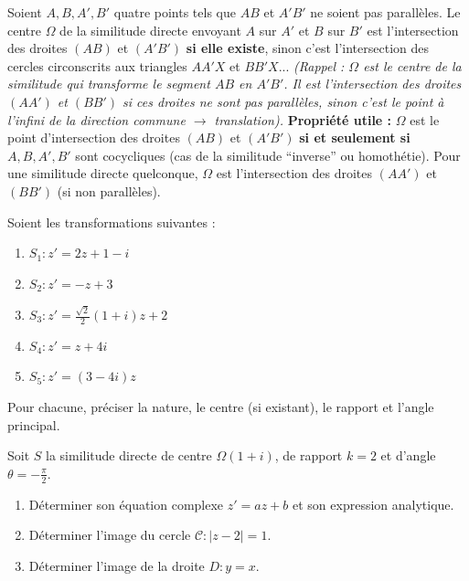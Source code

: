 \documentclass[11pt]{article}
\begin{document}
\begin{exemplebox}
Soient $A,B,A',B'$ quatre points tels que $AB$ et $A'B'$ ne soient pas parall\`eles. Le centre $\Omega$ de la similitude directe envoyant $A$ sur $A'$ et $B$ sur $B'$ est l'intersection des droites $(AB)$ et $(A'B')$ \textbf{si elle existe}, sinon c'est l'intersection des cercles circonscrits aux triangles $AA'X$ et $BB'X$... \emph{(Rappel : $\Omega$ est le centre de la similitude qui transforme le segment $AB$ en $A'B'$. Il est l'intersection des droites $(AA')$ et $(BB')$ si ces droites ne sont pas parall\`eles, sinon c'est le point \`a l'infini de la direction commune $\to$ translation).}
\textbf{Propri\'et\'e utile :} $\Omega$ est le point d'intersection des droites $(AB)$ et $(A'B')$ \textbf{si et seulement si} $A,B,A',B'$ sont cocycliques (cas de la similitude ``inverse'' ou homoth\'etie). Pour une similitude directe quelconque, $\Omega$ est l'intersection des droites $(AA')$ et $(BB')$ (si non parall\`eles).
\end{exemplebox}

\begin{exercice}
Soient les transformations suivantes :
\begin{enumerate}
\item $S_1 : z' = 2z + 1 - i$
\item $S_2 : z' = -z + 3$
\item $S_3 : z' = \frac{\sqrt{2}}{2}(1+i)z + 2$
\item $S_4 : z' = z + 4i$
\item $S_5 : z' = (3-4i)z$
\end{enumerate}
Pour chacune, pr\'eciser la nature, le centre (si existant), le rapport et l'angle principal.
\end{exercice}

\begin{exercice}
Soit $S$ la similitude directe de centre $\Omega(1+i)$, de rapport $k=2$ et d'angle $\theta = -\frac{\pi}{2}$.
\begin{enumerate}
\item D\'eterminer son \'equation complexe $z'=az+b$ et son expression analytique.
\item D\'eterminer l'image du cercle $\mathcal{C} : |z-2| = 1$.
\item D\'eterminer l'image de la droite $D : y = x$.
\end{enumerate}
\end{exercice}
\end{document}
